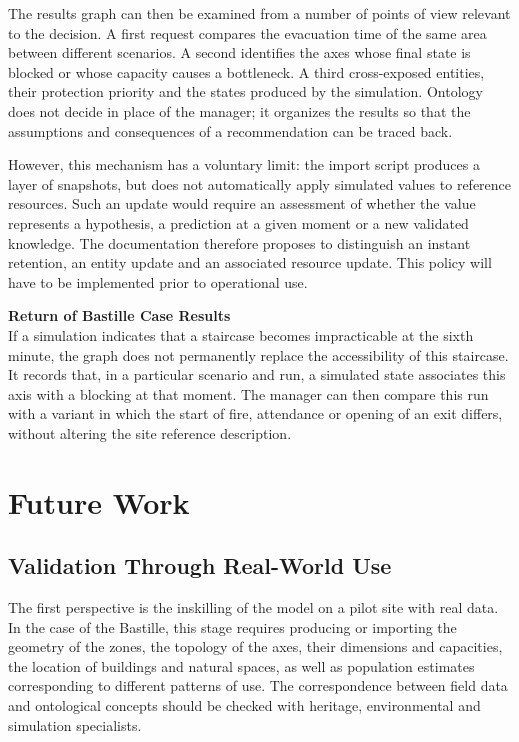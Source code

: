 \documentclass{article}
\begin{document}
The results graph can then be examined from a number of points of view relevant to the decision. A first request compares the evacuation time of the same area between different scenarios. A second identifies the axes whose final state is blocked or whose capacity causes a bottleneck. A third cross-exposed entities, their protection priority and the states produced by the simulation. Ontology does not decide in place of the manager; it organizes the results so that the assumptions and consequences of a recommendation can be traced back.

However, this mechanism has a voluntary limit: the import script produces a layer of snapshots, but does not automatically apply simulated values to reference resources. Such an update would require an assessment of whether the value represents a hypothesis, a prediction at a given moment or a new validated knowledge. The documentation therefore proposes to distinguish an instant retention, an entity update and an associated resource update. This policy will have to be implemented prior to operational use.

\begin{filrouge}
\textbf{Return of Bastille Case Results} \\
If a simulation indicates that a staircase becomes impracticable at the sixth minute, the graph does not permanently replace the accessibility of this staircase. It records that, in a particular scenario and run, a simulated state associates this axis with a blocking at that moment. The manager can then compare this run with a variant in which the start of fire, attendance or opening of an exit differs, without altering the site reference description.
\end{filrouge}

\clearpage
\section{Future Work}
\subsection{Validation Through Real-World Use}

The first perspective is the inskilling of the model on a pilot site with real data. In the case of the Bastille, this stage requires producing or importing the geometry of the zones, the topology of the axes, their dimensions and capacities, the location of buildings and natural spaces, as well as population estimates corresponding to different patterns of use. The correspondence between field data and ontological concepts should be checked with heritage, environmental and simulation specialists.
\end{document}
